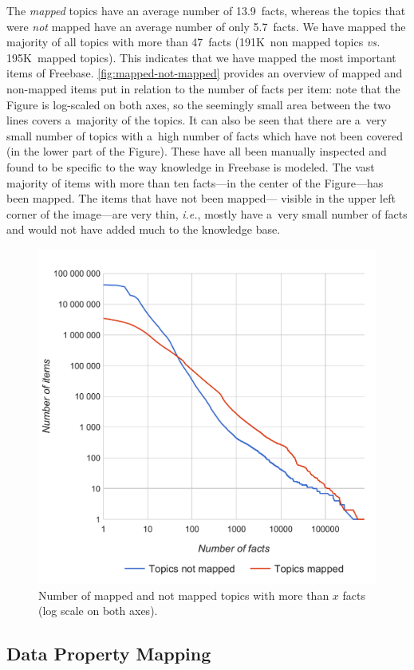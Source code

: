 \documentclass{sig-alternate-2013}
\begin{document}
The \emph{mapped} topics have an average number of 13.9~facts,
whereas the topics that were \emph{not} mapped have an average number of only 5.7~facts.
We have mapped the majority of all topics with more than 47~facts
(191K~non mapped topics \textit{vs.} 195K~mapped topics).
This indicates that we have mapped the most important items of Freebase.
\autoref{fig:mapped-not-mapped} provides an overview of mapped and non-mapped items
put in relation to the number of facts per item: note that the Figure is log-scaled
on both axes, so the seemingly small area between the two lines covers a~majority of
the topics. It can also be seen that there are a~very small number of topics with
a~high number of facts which have not been covered (in the lower part of the Figure).
These have all been manually inspected and found to be specific to the way knowledge
in Freebase is modeled. The vast majority of items with more than ten facts---in the
center of the Figure---has been mapped. The items that have not been mapped---%
visible in the upper left corner of the image---are very thin,
\emph{i.e.}, mostly have a~very small number of facts and
would not have added much to the knowledge base.

\begin{figure}[!htbp]
  \centering
  \includegraphics[width=8.45 cm]{img/facts-topics-mapping.pdf}
  \caption{Number of mapped and not mapped topics with more than $x$ facts (log scale on both axes).}
  \label{fig:mapped-not-mapped}
\end{figure}

\subsection{Data Property Mapping}
\end{document}
